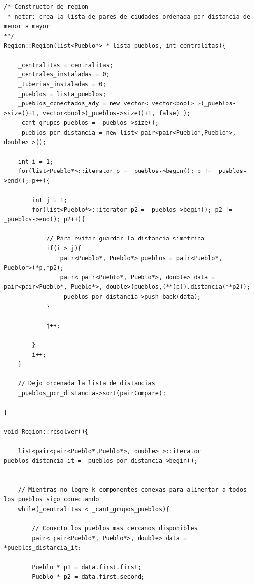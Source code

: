 \begin{lstlisting}


/* Constructor de region
 * notar: crea la lista de pares de ciudades ordenada por distancia de menor a mayor
**/
Region::Region(list<Pueblo*> * lista_pueblos, int centralitas){
	
	_centralitas = centralitas;
	_centrales_instaladas = 0;
	_tuberias_instaladas = 0;
	_pueblos = lista_pueblos;
	_pueblos_conectados_ady = new vector< vector<bool> >(_pueblos->size()+1, vector<bool>(_pueblos->size()+1, false) );
	_cant_grupos_pueblos = _pueblos->size();
	_pueblos_por_distancia = new list< pair<pair<Pueblo*,Pueblo*>, double> >();
	
	int i = 1;
	for(list<Pueblo*>::iterator p = _pueblos->begin(); p != _pueblos->end(); p++){
		
		int j = 1;
		for(list<Pueblo*>::iterator p2 = _pueblos->begin(); p2 != _pueblos->end(); p2++){
			
			// Para evitar guardar la distancia simetrica
			if(i > j){
				pair<Pueblo*, Pueblo*> pueblos = pair<Pueblo*, Pueblo*>(*p,*p2);
				pair< pair<Pueblo*, Pueblo*>, double> data = pair<pair<Pueblo*, Pueblo*>, double>(pueblos,(**(p)).distancia(**p2));
				_pueblos_por_distancia->push_back(data);
			}
			
			j++;
			
		}
		i++;
	}
	
	// Dejo ordenada la lista de distancias
	_pueblos_por_distancia->sort(pairCompare);
	
}

void Region::resolver(){
	
	list<pair<pair<Pueblo*,Pueblo*>, double> >::iterator pueblos_distancia_it = _pueblos_por_distancia->begin();
	

	// Mientras no logre k componentes conexas para alimentar a todos los pueblos sigo conectando
	while(_centralitas < _cant_grupos_pueblos){
		
		// Conecto los pueblos mas cercanos disponibles
		pair< pair<Pueblo*, Pueblo*>, double> data = *pueblos_distancia_it;
		
		Pueblo * p1 = data.first.first;
		Pueblo * p2 = data.first.second;
		

\end{lstlisting}

